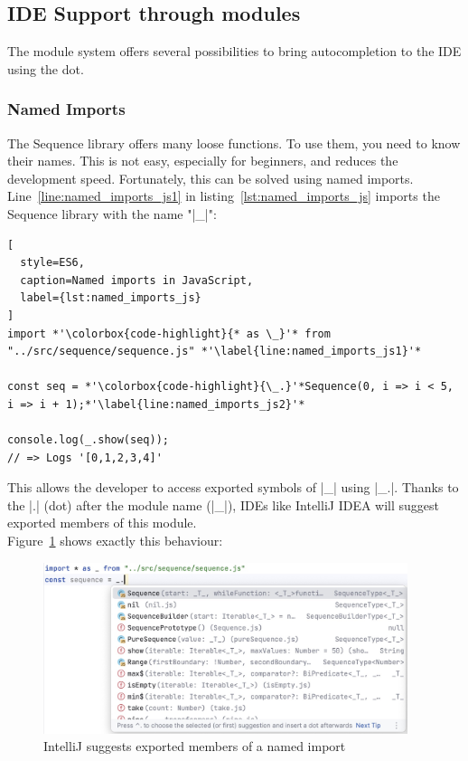 \subsection{IDE Support through modules} %
\label{sub:IDE support through modules}
The module system offers several possibilities to bring autocompletion to
the IDE using the dot.
\subsubsection{Named Imports} %
\label{subsub:Named Imports}
The Sequence library offers many loose functions. To use them, you need to know
their names. This is not easy, especially for beginners, and reduces the
development speed. Fortunately, this can be solved using named imports.
Line~\ref{line:named_imports_js1} in listing~\ref{lst:named_imports_js} imports
the Sequence library with the name "|_|":

\begin{lstlisting}[
  style=ES6,
  caption=Named imports in JavaScript,
  label={lst:named_imports_js}
]
import *'\colorbox{code-highlight}{* as \_}'* from "../src/sequence/sequence.js" *'\label{line:named_imports_js1}'*

const seq = *'\colorbox{code-highlight}{\_.}'*Sequence(0, i => i < 5, i => i + 1);*'\label{line:named_imports_js2}'*

console.log(_.show(seq));
// => Logs '[0,1,2,3,4]'
\end{lstlisting}
This allows the developer to access exported symbols of |_| using |_.|. Thanks
to the |.| (dot) after the module name (|_|), IDEs like IntelliJ IDEA will
suggest exported members of this module.\\
Figure~\ref{fig:the_power_of_the_dot_idea_sugg} shows exactly this behaviour:

\begin{figure}[H]
  \begin{center}
    \includegraphics[width=0.95\textwidth]{mainmatter/pictures/the-power-of-the-dot-intellj.jpg}
  \end{center}
  \caption{IntelliJ suggests exported members of a named import}
  \label{fig:the_power_of_the_dot_idea_sugg}
\end{figure}

